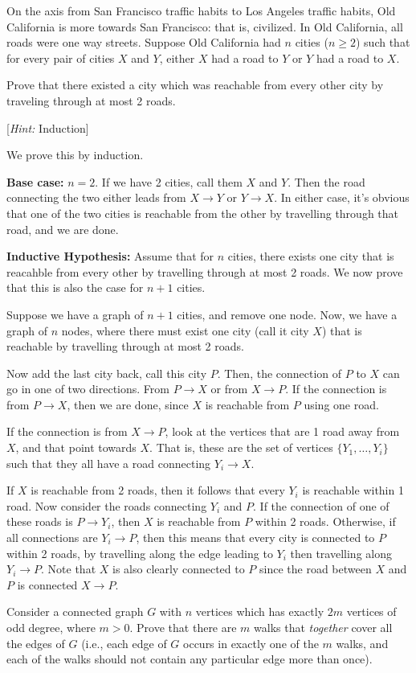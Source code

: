 \documentclass[11pt]{article}
\begin{document}
\begin{Parts}

\Part On the axis from San Francisco traffic habits to Los Angeles traffic habits, Old California is more towards San Francisco: that is, civilized. In Old California, all roads were one way streets. Suppose Old California had 
$n$ cities ($n \geq 2$) such that for every pair of cities $X$ and $Y$,
either $X$ had a road to $Y$ or $Y$ had a road to $X$.

Prove that there existed a city which was reachable from every other city by traveling through at most 2 roads. 

[\textit{Hint:} Induction]

\begin{solution}
    We prove this by induction. 

    \textbf{Base case:} $n = 2$. If we have 2 cities, call them $X$ and $Y$. Then the road connecting the two either leads from $X \to Y$ or $Y \to X$. In either case, it's obvious that one of the two cities is reachable from the other by travelling through that road, and we are done. 


    \textbf{Inductive Hypothesis:} Assume that for $n$ cities, there exists one city that is reacahble from every other by travelling through at most 2 roads. We now prove that this is also the case for $n+1$ cities. 
    
    Suppose we have a graph of $n+1$ cities, and remove one node. Now, we have a graph of $n$ nodes, where there must exist one city (call it city $X$) that is reachable by travelling through at most 2 roads. 

    Now add the last city back, call this city $P$. Then, the connection of $P$ to $X$ can go in one of two directions. From $P \to X$ or from $X \to P$. If the connection is from $P \to X$, then we are done, since $X$ is reachable from $P$ using one road. 

    If the connection is from $X \to P$, look at the vertices that are 1 road away from $X$, and that point towards $X$. That is, these are the set of vertices $\{Y_1, \dots, Y_i\}$ such that they all have a road connecting $Y_i \to X$.
    
    If $X$ is reachable from 2 roads, then it follows that every $Y_i$ is reachable within 1 road. Now consider the roads connecting $Y_i$ and $P$. If the connection of one of these roads is $P \to Y_i$, then $X$ is reachable from $P$ within 2 roads. Otherwise, if all connections are $Y_i \to P$, then this means that every city is connected to $P$ within 2 roads, by travelling along the edge leading to $Y_i$ then travelling along $Y_i \to P$. Note that $X$ is also clearly connected to $P$ since the road between $X$ and $P$ is connected $X \to P$.
\end{solution}
\Part Consider a connected graph $G$ with $n$ vertices which has exactly $2m$ vertices of
odd degree, where $m > 0$. Prove that there are $m$ walks that \emph{together} 
cover all the edges of $G$ (i.e., each edge of $G$ occurs in exactly one of the $m$ walks, 
and each of the walks should not contain any particular edge more than once).


\end{Parts}
\end{document}
